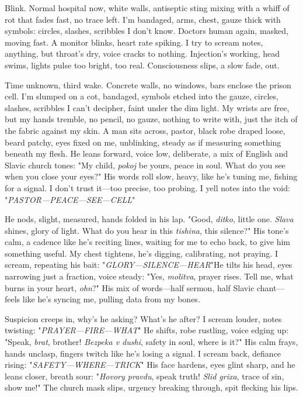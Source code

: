 \documentclass{article}
\begin{document}
Blink. Normal hospital now, white walls, antiseptic sting mixing with a whiff of rot that fades fast, no trace left. I'm bandaged, arms, chest, gauze thick with symbols: circles, slashes, scribbles I don't know. Doctors human again, masked, moving fast. A monitor blinks, heart rate spiking. I try to scream notes, anything, but throat's dry, voice cracks to nothing. Injection's working, head swims, lights pulse too bright, too real. Consciousness slips, a slow fade, out.

Time unknown, third wake. Concrete walls, no windows, bars enclose the prison cell. I'm slumped on a cot, bandaged, symbols etched into the gauze, circles, slashes, scribbles I can't decipher, faint under the dim light. My wrists are free, but my hands tremble, no pencil, no gauze, nothing to write with, just the itch of the fabric against my skin. A man sits across, pastor, black robe draped loose, beard patchy, eyes fixed on me, unblinking, steady as if measuring something beneath my flesh. He leans forward, voice low, deliberate, a mix of English and Slavic church tones: "My child, \textit{pokoj} be yours, peace in soul. What do you see when you close your eyes?" His words roll slow, heavy, like he's tuning me, fishing for a signal. I don't trust it—too precise, too probing. I yell notes into the void: "\textit{PASTOR—PEACE—SEE—CELL}"

He nods, slight, measured, hands folded in his lap. "Good, \textit{ditko}, little one. \textit{Slava} shines, glory of light. What do you hear in this \textit{tishina}, this silence?" His tone's calm, a cadence like he's reciting lines, waiting for me to echo back, to give him something useful. My chest tightens, he's digging, calibrating, not praying. I scream, repeating his bait: "\textit{GLORY—SILENCE—HEAR}"He tilts his head, eyes narrowing just a fraction, voice steady: "Yes, \textit{molitva}, prayer rises. Tell me, what burns in your heart, \textit{ohn}?" His mix of words—half sermon, half Slavic chant—feels like he's syncing me, pulling data from my bones.

Suspicion creeps in, why's he asking? What's he after? I scream louder, notes twisting: "\textit{PRAYER—FIRE—WHAT}" He shifts, robe rustling, voice edging up: "Speak, \textit{brat}, brother! \textit{Bezpeka v dushi}, safety in soul, where is it?" His calm frays, hands unclasp, fingers twitch like he's losing a signal. I scream back, defiance rising: "\textit{SAFETY—WHERE—TRICK}" His face hardens, eyes glint sharp, and he leans closer, breath sour: "\textit{Hovory pravdu}, speak truth! \textit{Slid grixa}, trace of sin, show me!" The church mask slips, urgency breaking through, spit flecking his lips.
\end{document}
